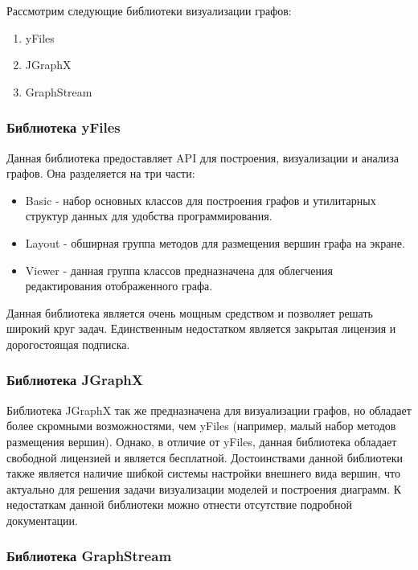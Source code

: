 Рассмотрим следующие библиотеки визуализации графов:

\begin{enumerate}
    \item yFiles
    \item JGraphX
    \item GraphStream
\end{enumerate}

\subsubsection{Библиотека yFiles}

Данная библиотека предоставляет API для построения, визуализации и анализа
графов. Она разделяется на три части:

\begin{itemize}
    \item Basic - набор основных классов для построения графов и утилитарных
    структур данных для удобства программирования.
    \item Layout - обширная группа методов для размещения вершин графа на
    экране.
    \item Viewer - данная группа классов предназначена для облегчения
    редактирования отображенного графа.
\end{itemize}

Данная библиотека является очень мощным средством и позволяет решать широкий
круг задач. Единственным недостатком является закрытая лицензия и дорогостоящая
подписка.

\subsubsection{Библиотека JGraphX}

Библиотека JGraphX так же предназначена для визуализации графов, но обладает
более скромными возможностями, чем yFiles (например, малый набор методов
размещения вершин). Однако, в отличие от yFiles, данная библиотека обладает
свободной лицензией и является бесплатной. Достоинствами данной библиотеки также
является наличие шибкой системы настройки внешнего вида вершин, что актуально
для решения задачи визуализации моделей и построения диаграмм. К недостаткам
данной библиотеки можно отнести отсутствие подробной документации.

\subsubsection{Библиотека GraphStream}

